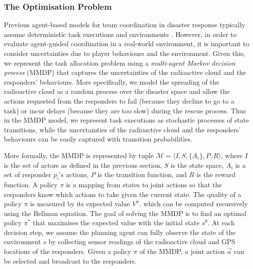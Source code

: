 \subsubsection{The Optimisation Problem}
\label{sec:model}

Previous agent-based models for team coordination in disaster
response typically assume deterministic task executions and
environments \cite{ramchurn:etal:2010,Scerri2005}. However, in
order to evaluate agent-guided coordination in a real-world
environment, it is important to consider uncertainties due to
player behaviours and the environment. Given this, we represent the
task allocation problem using a {\em multi-agent Markov decision
process} (MMDP) that captures the uncertainties of the radioactive
cloud and the responders' behaviours. More specifically, we model
the spreading of the radioactive cloud as a random process over the
disaster space and allow the actions requested from the responders
to  fail (because they decline to go to a  task) or incur delays
(because they are too slow) during the rescue process. Thus in the
MMDP model, we represent  task executions as stochastic processes
of state transitions, while the uncertainties of the radioactive
cloud and the responders' behaviours can be easily captured with
transition probabilities.

More formally, the MMDP is represented by tuple $\mathcal{M} =
\langle I, S, \{A_i\}, P, R \rangle$, where $I$ is the set of
actors as defined in the previous section,  $S$ is the state space,
$A_i$ is a set of responder $p_i$'s actions, $P$ is the transition
function, and $R$ is the reward function. A policy $\pi$ is a
mapping from states to joint actions so that the responders know
which actions to take given the current state. The quality of a
policy $\pi$ is measured by its expected value $V^\pi$, which can
be computed recursively using the Bellman equation. The goal of
solving the MMDP is to find an optimal policy $\pi^*$ that
maximises the expected value with the initial state $s^0$. At each
decision step, we assume the planning agent can fully observe the
state of the environment $s$ by collecting sensor readings of the
radioactive cloud and GPS locations of the responders. Given a
policy $\pi$ of the MMDP, a joint action $\vec{a}$ can be selected
and broadcast to the responders.
